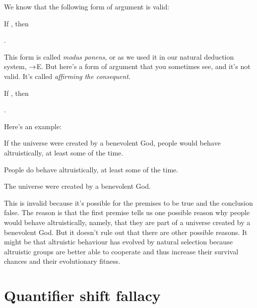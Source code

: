We know that the following form of argument is valid:
\begin{earg}
\prem If \metaX, then \metaY

\prem \metaX

\conc \metaY.
\end{earg}
This form is called \emph{modus ponens}, or as we used it in our natural deduction system, $\rightarrow$E. But here's a form of argument that you sometimes see, and it's not valid. It's called \emph{affirming the consequent}.
\begin{earg}
\prem If \metaX, then \metaY

\prem \metaY

\conc \metaX.
\end{earg}
Here's an example:
\begin{earg}
\prem If the universe were created by a benevolent God, people would behave altruistically, at least some of the time.

\prem People do behave altruistically, at least some of the time.

\conc The universe were created by a benevolent God.
\end{earg}
This is invalid because it's possible for the premises to be true and the conclusion false. The reason is that the first premise tells us one possible reason why people would behave altruistically, namely, that they are part of a universe created by a benevolent God. But it doesn't rule out that there are other possible reasons. It might be that altruistic behaviour has evolved by natural selection because altruistic groups are better able to cooperate and thus increase their survival chances and their evolutionary fitness. 


\section{Quantifier shift fallacy}

